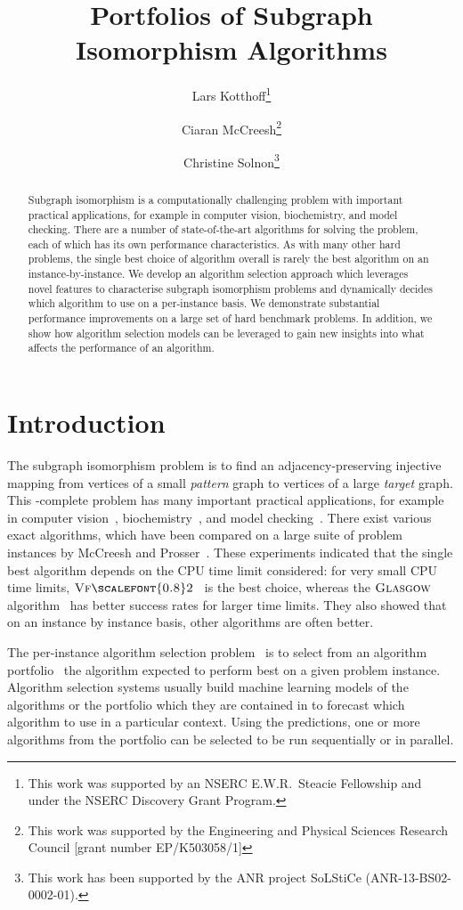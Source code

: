 \documentclass{llncs}
\title{Portfolios of Subgraph Isomorphism Algorithms}
\author{
    Lars Kotthoff\thanks{This work was supported by an NSERC E.W.R.\ Steacie
    Fellowship and under the NSERC Discovery Grant Program.}\inst{1}
    \and Ciaran McCreesh\thanks{This work was supported by the Engineering
        and Physical Sciences Research Council [grant number EP/K503058/1]}\inst{2}
    \and Christine Solnon\thanks{This work has been supported by the ANR project SoLStiCe (ANR-13-BS02-0002-01).}\inst{3}}
\institute{
    University of British Columbia, Vancouver, Canada
    \and University of Glasgow, Glasgow, Scotland
    \and INSA-Lyon, LIRIS, UMR5205, F-69621, France}
\newcommand{\VFtwo}{$\textsc{Vf{\scalefont{0.8}2}}$\xspace}
\newcommand{\Glasgow}{$\textsc{Glasgow}$\xspace}
\begin{document}
\maketitle

\begin{abstract}
Subgraph isomorphism is a computationally challenging problem with important practical
applications, for example in computer vision, biochemistry, and model checking. There are a number
of state-of-the-art algorithms for solving the problem, each of which has its own performance
characteristics. As with many other hard problems, the single best choice of algorithm overall is
rarely the best algorithm on an instance-by-instance. We develop an algorithm
selection approach which leverages
novel features to characterise subgraph isomorphism problems and dynamically
decides which algorithm
to use on a per-instance basis. We demonstrate substantial performance improvements on a large set
of hard benchmark problems. In addition, we show how algorithm selection models can be leveraged to
gain new insights into what affects the performance of an algorithm.
\end{abstract}

\section{Introduction}

The subgraph isomorphism problem is to find an adjacency-preserving injective mapping from vertices
of a small \emph{pattern} graph to vertices of a large \emph{target} graph. This \NP-complete
problem has many important practical applications, for example in computer
vision~\cite{cviu11,pr15}, biochemistry~\cite{Giugno:2013}, and model checking~\cite{Sevegnani:2015}. There
exist various exact algorithms, which have been compared on a large suite of problem instances by
McCreesh and Prosser~\cite{McCreesh:2015}. These experiments indicated that the single best
algorithm depends on the CPU time limit considered: for very small CPU time
limits, \VFtwo{}~\cite{Cordella:2004} is the best choice, whereas the \Glasgow algorithm~\cite{McCreesh:2015} has
better success rates for larger time limits.  They also showed that on an instance by instance
basis, other algorithms are often better.


The per-instance algorithm selection problem~\cite{rice_algorithm_1976} is to select from an
algorithm portfolio~\cite{huberman_economics_1997,gomes_algorithm_2001} the
algorithm expected to perform
best on a given problem instance. Algorithm selection systems usually build machine learning models
of the algorithms or the portfolio which they are contained in to forecast which algorithm to use in a
particular context. Using the predictions, one or more algorithms from the
portfolio can be selected to be run sequentially or in parallel.
\end{document}
